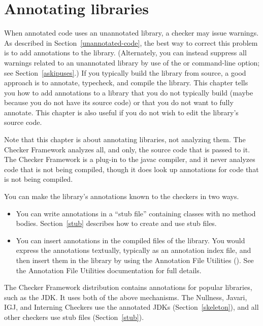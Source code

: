 \htmlhr
\chapter{Annotating libraries\label{annotating-libraries}}

When annotated code uses an unannotated library, a checker may issue warnings.
As described in Section~\ref{unannotated-code}, the best way to correct
this problem is to add annotations to the library.  (Alternately, you can instead
suppress all warnings related to an unannotated library by use of the
 or  command-line option; see
Section~\ref{askipuses}.)  If you typically build the library from source,
a good approach is to annotate, typecheck, and compile the library.
This chapter tells you
how to add annotations to a library that you do not typically build
(maybe because you do not have its source code)
or that you do not want to fully annotate.
This chapter is also useful if you do not wish to edit the
library's source code.

Note that this chapter is about annotating libraries, not analyzing them.
The Checker Framework analyzes all, and only, the source code that is
passed to it.  The Checker Framework is a plug-in to the javac compiler,
and it never analyzes code that is not being compiled, though it does look
up annotations for code that is not being compiled.

You can make the library's annotations known to the checkers in two ways.

\begin{itemize}

\item
  You can write annotations in a ``stub
  file'' containing classes with no method bodies.
  Section~\ref{stub} describes how to create and use stub files.

\item
  You can insert annotations in the compiled
   files of the library.
  You would express the annotations textually, typically as an annotation index file, and
  then insert them in the library by using the Annotation File Utilities
  ().
  See the Annotation File Utilities documentation for full details.

\end{itemize}

The Checker Framework distribution contains annotations for popular
libraries, such as the JDK\@.  It uses both of the above mechanisms.  The
Nullness, Javari, IGJ, and Interning Checkers use the annotated JDKs
(Section~\ref{skeleton}), and all other checkers use stub files
(Section~\ref{stub}).

